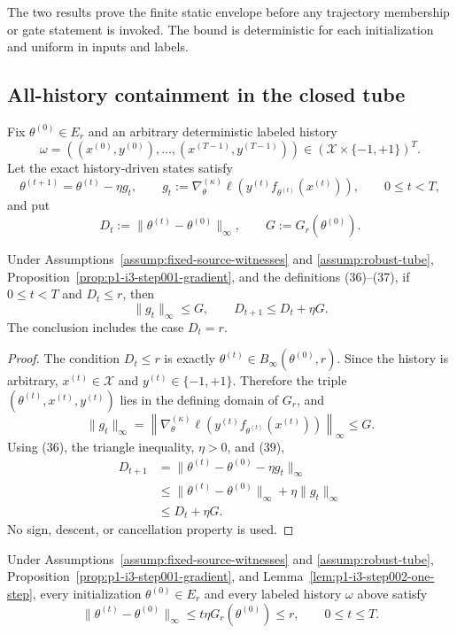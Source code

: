 The two results prove the finite static envelope before any trajectory
membership or gate statement is invoked.  The bound is deterministic for each
initialization and uniform in inputs and labels.

\subsection{All-history containment in the closed tube}
\label{app:step002-containment}

Fix $\theta^{(0)}\in E_r$ and an arbitrary deterministic labeled history
\[
\omega=((x^{(0)},y^{(0)}),\ldots,(x^{(T-1)},y^{(T-1)}))
\in(\mathcal X\times\{-1,+1\})^T.
\]
Let the exact history-driven states satisfy
\[
\theta^{(t+1)}=\theta^{(t)}-\eta g_t,
\qquad
g_t:=\nabla_\theta^{(\kappa)}
\ell(y^{(t)}f_{\theta^{(t)}}(x^{(t)})),
\qquad0\leq t<T,
\tag{36}
\]
and put
\[
D_t:=\|\theta^{(t)}-\theta^{(0)}\|_\infty,
\qquad G:=G_r(\theta^{(0)}).
\tag{37}
\]

\begin{lemma}
\label{lem:p1-i3-step002-one-step}
Under Assumptions~\ref{assump:fixed-source-witnesses} and
\ref{assump:robust-tube}, Proposition~\ref{prop:p1-i3-step001-gradient},
and the definitions (36)--(37), if $0\leq t<T$ and $D_t\leq r$, then
\[
\|g_t\|_\infty\leq G,
\qquad D_{t+1}\leq D_t+\eta G.
\tag{38}
\]
The conclusion includes the case $D_t=r$.
\end{lemma}

\begin{proof}
The condition $D_t\leq r$ is exactly
$\theta^{(t)}\in B_\infty(\theta^{(0)},r)$.  Since the history is arbitrary,
$x^{(t)}\in\mathcal X$ and $y^{(t)}\in\{-1,+1\}$.  Therefore the triple
$(\theta^{(t)},x^{(t)},y^{(t)})$ lies in the defining domain of $G_r$, and
\[
\|g_t\|_\infty
=\left\|\nabla_\theta^{(\kappa)}
\ell(y^{(t)}f_{\theta^{(t)}}(x^{(t)}))\right\|_\infty\leq G.
\tag{39}
\]
Using (36), the triangle inequality, $\eta>0$, and (39),
\[
\begin{aligned}
D_{t+1}
&=\|\theta^{(t)}-\theta^{(0)}-\eta g_t\|_\infty\\
&\leq\|\theta^{(t)}-\theta^{(0)}\|_\infty+\eta\|g_t\|_\infty\\
&\leq D_t+\eta G.
\end{aligned}
\tag{40}
\]
No sign, descent, or cancellation property is used.
\end{proof}

\begin{proposition}
\label{prop:p1-i3-step002-closed-tube}
Under Assumptions~\ref{assump:fixed-source-witnesses} and
\ref{assump:robust-tube}, Proposition~\ref{prop:p1-i3-step001-gradient},
and Lemma~\ref{lem:p1-i3-step002-one-step}, every initialization
$\theta^{(0)}\in E_r$ and every labeled history $\omega$ above satisfy
\[
\|\theta^{(t)}-\theta^{(0)}\|_\infty
\leq t\eta G_r(\theta^{(0)})\leq r,
\qquad 0\leq t\leq T.
\tag{41}
\]
\end{proposition}

